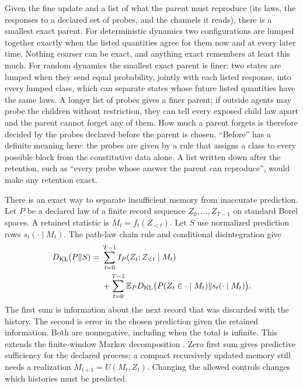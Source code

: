 Given the fine update and a list of what the parent must reproduce (its
laws, the responses to a declared set of probes, and the channels it reads),
there is a smallest exact parent. For deterministic dynamics two
configurations are lumped together exactly when the listed quantities agree
for them now and at every later time. Nothing coarser can be exact, and
anything exact remembers at least this much. For random dynamics the
smallest exact parent is finer: two states are lumped when they send equal
probability, jointly with each listed response, into every lumped class,
which can separate states whose future listed quantities have the same
laws. A longer list of probes gives a finer parent; if outside agents
may probe the children without restriction, they can tell every exposed child
law apart and the parent cannot forget any of them. How much a parent
forgets is therefore decided by the probes declared before the parent is
chosen. ``Before'' has a definite meaning here: the probes are given by a
rule that assigns a class to every possible block from the constitutive data
alone. A list written down after the retention, such as ``every probe whose
answer the parent can reproduce'', would make any retention exact.

There is an exact way to separate insufficient memory from inaccurate prediction. Let $P$ be a declared law of a finite record sequence $Z_0,\ldots,Z_{T-1}$ on standard Borel spaces. A retained statistic is $M_t=f_t(Z_{<t})$. Let $S$ use normalized prediction rows $s_t(\cdot\mid M_t)$. The path-law chain rule and conditional disintegration give
\begin{equation}
\begin{split}
D_{\mathrm{KL}}(P\|S)
={}&\sum_{t=0}^{T-1}I_P(Z_t;Z_{<t}\mid M_t)\\
&+\sum_{t=0}^{T-1}\mathbb E_P
D_{\mathrm{KL}}\bigl(P(Z_t\in\cdot\mid M_t)\|s_t(\cdot\mid M_t)\bigr).
\end{split}
\end{equation}
The first sum is information about the next record that was discarded with the history. The second is error in the chosen prediction given the retained information. Both are nonnegative, including when the total is infinite. This extends the finite-window Markov decomposition \citep[Thm.~7.3.1]{Gray1990}. Zero first sum gives predictive sufficiency for the declared process; a compact recursively updated memory still needs a realization $M_{t+1}=U(M_t,Z_t)$. Changing the allowed controls changes which histories must be predicted.

